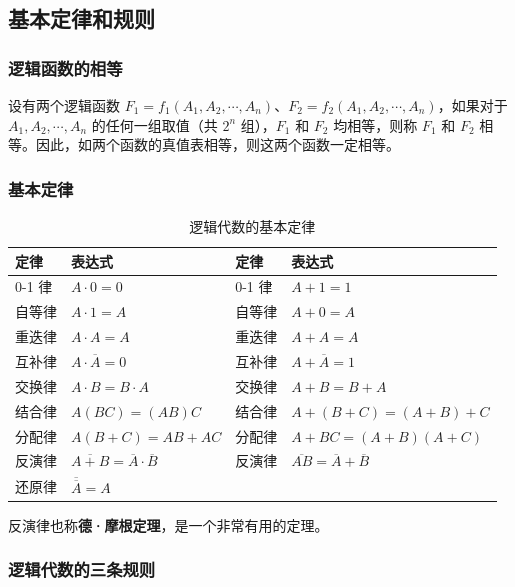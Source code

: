 \subsection{基本定律和规则}
\label{sec:基本定律和规则}

\subsubsection{逻辑函数的相等}

设有两个逻辑函数 $F_1=f_1(A_1,A_2,\cdots,A_n)$、$F_2=f_2(A_1,A_2,\cdots,A_n)$，如果对于 $A_1,A_2,\cdots,A_n$ 的任何一组取值（共 $2^n$ 组），$F_1$ 和 $F_2$ 均相等，则称 $F_1$ 和 $F_2$ 相等。因此，如两个函数的真值表相等，则这两个函数一定相等。

\subsubsection{基本定律}

\begin{table}[H]
\centering
\caption{逻辑代数的基本定律}
\label{tab:定律:基本定律}
\begin{tabular}{llll}
	\toprule
	定律 & 表达式 & 定律 & 表达式 \\
	\midrule
	0-1 律 & $A\cdot0=0$ & 0-1 律 & $A+1=1$ \\
	自等律 & $A\cdot1=A$ & 自等律 & $A+0=A$ \\
	重迭律 & $A\cdot A=A$ & 重迭律 & $A+A=A$ \\
	互补律 & $A\cdot\overline{A}=0$ & 互补律 & $A+\overline{A}=1$ \\
	交换律 & $A\cdot B=B\cdot A$ & 交换律 & $A+B=B+A$ \\
	结合律 & $A(BC)=(AB)C$ & 结合律 & $A+(B+C)=(A+B)+C$ \\
	分配律 & $A(B+C)=AB+AC$ & 分配律 & $A+BC=(A+B)(A+C)$ \\
	反演律 & $\overline{A+B}=\overline{A}\cdot\overline{B}$ & 反演律 & $\overline{AB}=\overline{A}+\overline{B}$ \\
	还原律 & $\overline{\overline{A}}=A$ &  &  \\
	\bottomrule
\end{tabular}
\end{table}

反演律也称\textbf{德·摩根定理}，是一个非常有用的定理。

\subsubsection{逻辑代数的三条规则}

